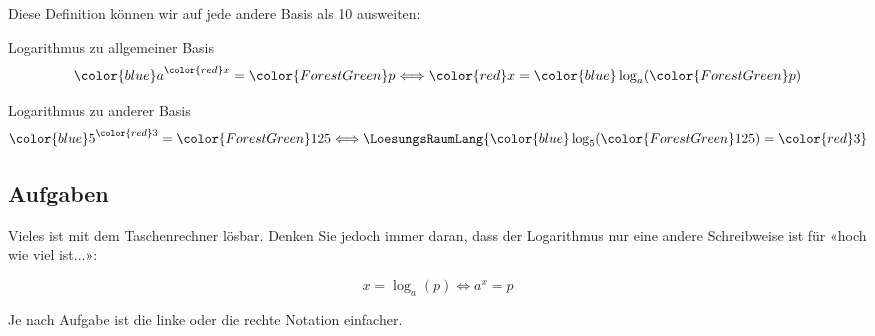 Diese Definition können wir auf jede andere Basis als 10 ausweiten:

 \begin{definition}{Logarithmus zu allgemeiner Basis}{}
   $${\color{blue}a}^{\color{red}x}={\color{ForestGreen}p} \Longleftrightarrow {\color{red}x} = {\color{blue} \log_a}({\color{ForestGreen}p})$$
   \end{definition}


 \begin{beispiel}{Logarithmus zu anderer Basis}{}
$$   {\color{blue}5}^{\color{red}3} = {\color{ForestGreen}125}
   \Longleftrightarrow \LoesungsRaumLang{{\color{blue}\log_5}({\color{ForestGreen}125}) = {\color{red}3}}$$
   \end{beispiel}
 

\subsection*{Aufgaben}

Vieles ist mit dem Taschenrechner lösbar. Denken Sie jedoch immer
daran, dass der Logarithmus nur eine andere Schreibweise ist für «hoch
wie viel ist...»:

$$x=\log_a(p) \Longleftrightarrow  a^x=p$$

Je nach Aufgabe ist die linke oder die rechte Notation einfacher.






